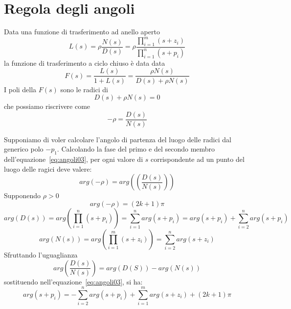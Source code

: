 \documentclass[a4paper]{report}
\begin{document}
\section{Regola degli angoli}
Data una funzione di trasferimento ad anello aperto 
\begin{equation}\label{eq:angoli01}
L(s) = \rho \dfrac{N(s)}{D(s)} = \rho \dfrac{\prod\limits_{i =
    1}^{m} (s + z_i)}{\prod\limits_{i = 1}^{n} (s + p_i)}
\end{equation}
la funzione di trasferimento a ciclo chiuso \`e data data
\begin{equation}\label{eq:angoli02}
F(s) = \dfrac{L(s)}{1 + L(s)} =  \dfrac{\rho N(s)}{D(s) + \rho N(s)}
\end{equation}
I poli della $F(s)$ sono le radici di
\[
D(s) + \rho N(s) = 0
\]
che possiamo riscrivere come
\begin{equation}\label{eq:angoli03}
- \rho = \dfrac{D(s)}{N(s)}
\end{equation}

Supponiamo di voler calcolare l'angolo di partenza del luogo delle
radici dal generico polo $-p_1$. Calcolando la fase del primo e del
secondo membro dell'equazione~\ref{eq:angoli03}, per ogni valore di
$s$ corrispondente ad un punto del luogo delle ragici deve valere:
\begin{equation}\label{eq:angoli04}
arg(- \rho) = arg \left((\dfrac{D(s)}{N(s)}) \right)
\end{equation}
Supponendo $\rho > 0$
\[
arg(- \rho) = (2k + 1)\pi
\]
\[
arg(D(s)) = arg\left( \prod\limits_{i = 1}^{n}(s + p_i) \right) =
\sum\limits_{i = 1}^{n} arg(s + p_i) = arg(s + p_i) + \sum\limits_{i =
2}^{n} arg(s + p_i)
\]
\[
arg(N(s)) = arg\left( \prod\limits_{i = 1}^{m}(s + z_i) \right) = \sum\limits_{i =
2}^{n} arg(s + z_i)
\]
Sfruttando l'uguaglianza
\[
arg \left( \dfrac{D(s)}{N(s)}\right) = arg(D(S)) - arg(N(s))
\]
sostituendo nell'equazione~\ref{eq:angoli03}, si ha:
\begin{equation}\label{eq:angoli05}
  arg(s + p_i) = - \sum\limits_{i = 2}^{n} arg(s + p_i) +
  \sum\limits_{i = 1}^{m} arg(s + z_i) + (2k + 1)\pi
\end{equation}
\end{document}
